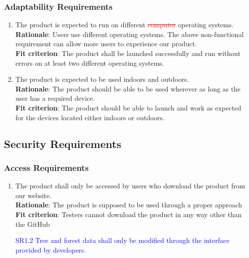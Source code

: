 \documentclass{article}
\begin{document}
\subsubsection{Adaptability Requirements}
\begin{enumerate}[MS3.1]
    \item The product is expected to run on different \textcolor{red}{\st{computer}} 
    operating systems.\\
    \textbf{Rationale}: Users use different operating systems. The above 
    non-functional requirement can allow more users to experience our product.\\
    \textbf{Fit criterion}: The product shall be launched successfully and run without errors on at
     least two different operating systems.\\
    
    \item The product is expected to be used indoors and outdoors.\\
    \textbf{Rationale}: The product should be able to be used wherever as long as the user has a
     required device.\\
    \textbf{Fit criterion}: The product should be able to launch and work as expected for the devices
     located either indoors or outdoors. \\
\end{enumerate}
\subsection{Security Requirements}
\subsubsection{Access Requirements}
\begin{enumerate}[SR1.1]
    \item The product shall only be accessed by users who download the product from our website.\\
    \textbf{Rationale}: The product is supposed to be used through a proper approach\\
    \textbf{Fit criterion}: Testers cannot download the product in any way other than the GitHub
    
    \item[\textcolor{blue}{SR1.2}] \textcolor{blue}{Tree and forest
    data shall only be modified through the interface provided by developers.}
\end{enumerate}
\end{document}
